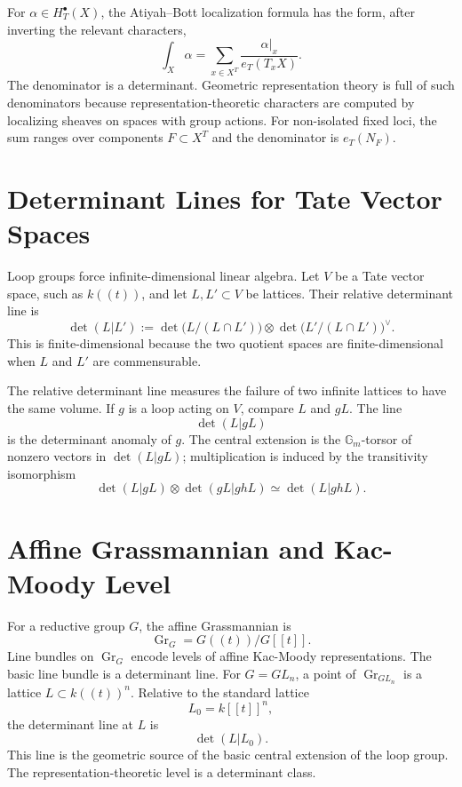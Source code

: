 \documentclass[11pt]{memoir}
\providecommand{\bG}{\mathbb{G}}
\begin{document}
For \(\alpha\in H_T^\bullet(X)\), the Atiyah--Bott localization
formula has the form, after inverting the relevant characters,
\[
  \int_X\alpha
  =
  \sum_{x\in X^T}
  \frac{\alpha|_x}{e_T(T_xX)}.
\]
The denominator is a determinant. Geometric representation theory is
full of such denominators because representation-theoretic characters
are computed by localizing sheaves on spaces with group actions.
For non-isolated fixed loci, the sum ranges over components
\(F\subset X^T\) and the denominator is \(e_T(N_F)\).

\section{Determinant Lines for Tate Vector Spaces}
\label{sec:tate-det-lines}

Loop groups force infinite-dimensional linear algebra. Let \(V\) be a
Tate vector space, such as \(k((t))\), and let \(L,L'\subset V\) be
lattices. Their relative determinant line is
\[
  \det(L|L')
  :=
  \det\bigl(L/(L\cap L')\bigr)
  \otimes
  \det\bigl(L'/(L\cap L')\bigr)^\vee.
\]
This is finite-dimensional because the two quotient spaces are
finite-dimensional when \(L\) and \(L'\) are commensurable.

The relative determinant line measures the failure of two infinite
lattices to have the same volume. If \(g\) is a loop acting on \(V\),
compare \(L\) and \(gL\). The line
\[
  \det(L|gL)
\]
is the determinant anomaly of \(g\). The central extension is the
\(\bG_m\)-torsor of nonzero vectors in \(\det(L|gL)\); multiplication
is induced by the transitivity isomorphism
\[
  \det(L|gL)\otimes\det(gL|ghL)\simeq\det(L|ghL).
\]

\section{Affine Grassmannian and Kac-Moody Level}
\label{sec:affine-grassmannian}

For a reductive group \(G\), the affine Grassmannian is
\[
  \operatorname{Gr}_G=G((t))/G[[t]].
\]
Line bundles on \(\operatorname{Gr}_G\) encode levels of affine
Kac-Moody representations. The basic line bundle is a determinant
line. For \(G=GL_n\), a point of \(\operatorname{Gr}_{GL_n}\) is a
lattice \(L\subset k((t))^n\). Relative to the standard lattice
\[
  L_0=k[[t]]^n,
\]
the determinant line at \(L\) is
\[
  \det(L|L_0).
\]
This line is the geometric source of the basic central extension of
the loop group. The representation-theoretic level is a determinant
class.
\end{document}
